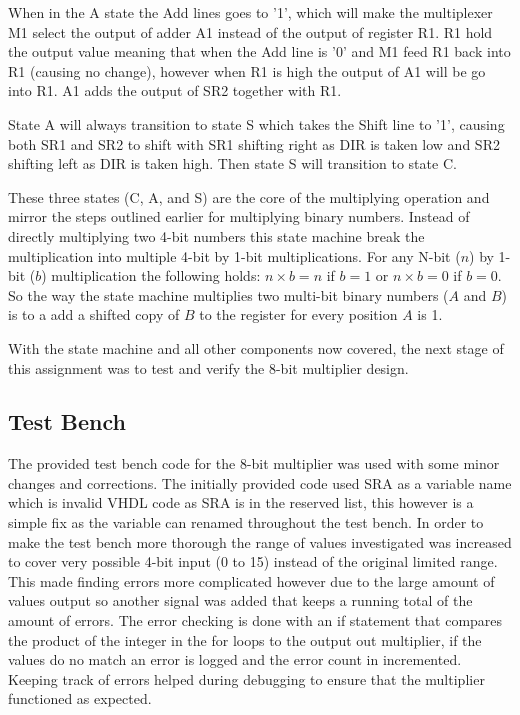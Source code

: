 \documentclass[11pt]{article}
\begin{document}
When in the A state the Add lines goes to '1', which will make the multiplexer M1 select the output of adder A1 instead of the output of register R1.
R1 hold the output value meaning that when the Add line is '0' and M1 feed R1 back into R1 (causing no change), however when R1 is high the output of A1 will be go into R1.
A1 adds the output of SR2 together with R1.

State A will always transition to state S which takes the Shift line to '1', causing both SR1 and SR2 to shift with SR1 shifting right as DIR is taken low and SR2 shifting left as DIR is taken high.
Then state S will transition to state C.

These three states (C, A, and S) are the core of the multiplying operation and mirror the steps outlined earlier for multiplying binary numbers.
Instead of directly multiplying two 4-bit numbers this state machine break the multiplication into multiple 4-bit by 1-bit multiplications.
For any N-bit ($n$) by 1-bit ($b$) multiplication the following holds: $n \times b = n$ if $b = 1$ or $n \times b = 0$ if $b = 0$.
So the way the state machine multiplies two multi-bit binary numbers ($A$ and $B$) is to a add a shifted copy of $B$ to the register for every position $A$ is 1\cite{dally}. 

With the state machine and all other components now covered, the next stage of this assignment was to test and verify the 8-bit multiplier design.

\subsection{Test Bench}
The provided test bench code for the 8-bit multiplier was used with some minor changes and corrections.
The initially provided code used SRA as a variable name which is invalid VHDL code as SRA is in the reserved list,
this however is a simple fix as the variable can renamed throughout the test bench.
In order to make the test bench more thorough the range of values investigated was increased to cover very possible 4-bit input (0 to 15) instead of the original limited range.
This made finding errors more complicated however due to the large amount of values output so another signal was added that keeps a running total of the amount of errors.
The error checking is done with an if statement that compares the product of the integer in the for loops to the output out multiplier,
if the values do no match an error is logged and the error count in incremented. 
Keeping track of errors helped during debugging to ensure that the multiplier functioned as expected. 
\end{document}
